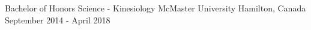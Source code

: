 %

\begin{cventries}
  \cventry
    {Bachelor of Honors Science - Kinesiology} %
    {McMaster University} %
    {Hamilton, Canada} %
    {September 2014 - April 2018} %
    {}
\end{cventries}
